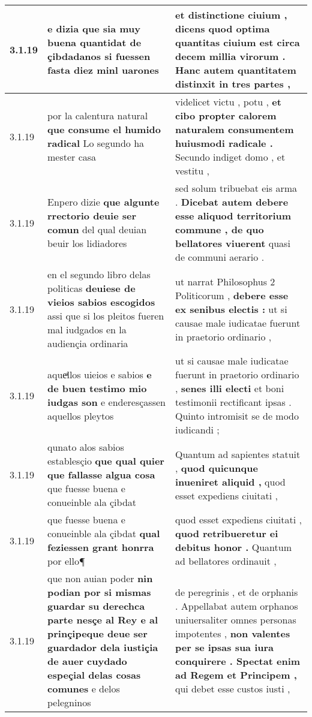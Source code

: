 \begin{tabular}{|p{1cm}|p{6.5cm}|p{6.5cm}|}
3.1.19 & e dizia \textbf{ que sia muy buena quantidat de çibdadanos } si fuessen fasta diez minl uarones & et distinctione ciuium , dicens \textbf{ quod optima quantitas ciuium est circa decem millia virorum . } Hanc autem quantitatem distinxit in tres partes , \\\hline
3.1.19 & por la calentura natural \textbf{ que consume el humido radical } Lo segundo ha mester casa & videlicet victu , potu , \textbf{ et cibo propter calorem naturalem consumentem huiusmodi radicale . } Secundo indiget domo , et vestitu , \\\hline
3.1.19 & Enpero dizie \textbf{ que algunte rrectorio deuie ser comun } del qual deuian beuir los lidiadores & sed solum tribuebat eis arma . \textbf{ Dicebat autem debere esse aliquod territorium commune , de quo bellatores viuerent } quasi de communi aerario . \\\hline
3.1.19 & en el segundo libro delas politicas \textbf{ deuiese de vieios sabios escogidos } assi que si los pleitos fueren mal iudgados en la audiençia ordinaria & ut narrat Philosophus 2 Politicorum , \textbf{ debere esse ex senibus electis : } ut si causae male iudicatae fuerunt in praetorio ordinario , \\\hline
3.1.19 & aqueͣllos uieios e sabios \textbf{ e de buen testimo mio iudgas son } e enderesçassen aquellos pleytos & ut si causae male iudicatae fuerunt in praetorio ordinario , \textbf{ senes illi electi } et boni testimonii rectificant ipsas . Quinto intromisit se de modo iudicandi ; \\\hline
3.1.19 & qunato alos sabios establesçio \textbf{ que qual quier que fallasse algua cosa } que fuesse buena e conueinble ala çibdat & Quantum ad sapientes statuit , \textbf{ quod quicunque inueniret aliquid , } quod esset expediens ciuitati , \\\hline
3.1.19 & que fuesse buena e conueinble ala çibdat \textbf{ qual feziessen grant honrra } por ello¶ & quod esset expediens ciuitati , \textbf{ quod retribueretur ei debitus honor . } Quantum ad bellatores ordinauit , \\\hline
3.1.19 & que non auian poder \textbf{ nin podian por si mismas guardar su derechca parte nesçe al Rey e al prinçipeque deue ser guardador dela iustiçia de auer cuydado espeçial delas cosas comunes } e delos pelegninos & de peregrinis , et de orphanis . Appellabat autem orphanos uniuersaliter omnes personas impotentes , \textbf{ non valentes per se ipsas sua iura conquirere . Spectat enim ad Regem et Principem , } qui debet esse custos iusti , \\\hline

\end{tabular}
